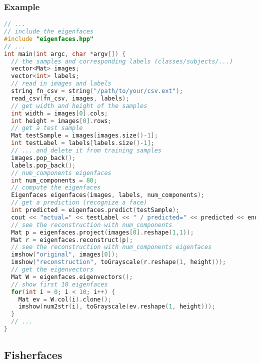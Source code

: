 \subsubsection{Example}
\begin{lstlisting}[language=c++]
// ...
// include the eigenfaces
#include "eigenfaces.hpp"
// ...
int main(int argc, char *argv[]) {
  // the samples and corresponding labels (classes/subjects/...)
  vector<Mat> images;
  vector<int> labels;
  // read in images and labels
  string fn_csv = string("/path/to/your/csv.ext");
  read_csv(fn_csv, images, labels);
  // get width and height of the samples
  int width = images[0].cols;
  int height = images[0].rows;
  // get a test sample
  Mat testSample = images[images.size()-1];
  int testLabel = labels[labels.size()-1];
  // ... and delete it from training samples
  images.pop_back();
  labels.pop_back();
  // num_components eigenfaces 
  int num_components = 80;
  // compute the eigenfaces
  Eigenfaces eigenfaces(images, labels, num_components);
  // get a prediction (recognize a face)
  int predicted = eigenfaces.predict(testSample);
  cout << "actual=" << testLabel << " / predicted=" << predicted << endl;
  // see the reconstruction with num_components
  Mat p = eigenfaces.project(images[0].reshape(1,1));
  Mat r = eigenfaces.reconstruct(p);
  // see the reconstruction with num_components eigenfaces
  imshow("original", images[0]);
  imshow("reconstruction", toGrayscale(r.reshape(1, height)));
  // get the eigenvectors
  Mat W = eigenfaces.eigenvectors();
  // show first 10 eigenfaces
  for(int i = 0; i < 10; i++) {
    Mat ev = W.col(i).clone();
    imshow(num2str(i), toGrayscale(ev.reshape(1, height)));
  }
  // ...
}
\end{lstlisting}
\subsection{Fisherfaces}

